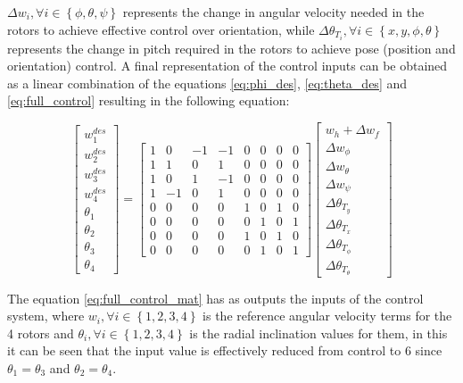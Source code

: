 \documentclass[a4paper, 12pt, oneside]{book}
\begin{document}
$\Delta w_i, \forall i \in \left \{ \phi, \theta, \psi \right \}$ represents the change in angular velocity needed in the rotors to achieve effective control over orientation, while $\Delta \theta_{T_i}, \forall i \in \left \{ x, y, \phi, \theta \right \}$ represents the change in pitch required in the rotors to achieve pose (position and orientation) control. A final representation of the control inputs can be obtained as a linear combination of the equations \ref{eq:phi_des}, \ref{eq:theta_des} and \ref{eq:full_control} resulting in the following equation:

\begin{equation}
\begin{bmatrix}
w_1^{des}\\ 
w_2^{des}\\ 
w_3^{des}\\ 
w_4^{des}\\ 
\theta_1\\ 
\theta_2\\ 
\theta_3\\ 
\theta_4
\end{bmatrix}
=
\begin{bmatrix}
1 & 0 & -1 & -1 & 0 & 0 & 0 & 0\\ 
1 & 1 & 0 & 1 & 0 & 0 & 0 & 0\\ 
1 & 0 & 1 & -1 & 0 & 0 & 0 & 0\\ 
1 & -1 & 0 & 1 & 0 & 0 & 0 & 0\\ 
0 & 0 & 0 & 0 & 1 & 0 & 1 & 0\\ 
0 & 0 & 0 & 0 & 0 & 1 & 0 & 1\\ 
0 & 0 & 0 & 0 & 1 & 0 & 1 & 0\\ 
0 & 0 & 0 & 0 & 0 & 1 & 0 & 1
\end{bmatrix}
\begin{bmatrix}
w_h+\Delta w_f\\ 
\Delta w_\phi\\ 
\Delta w_\theta\\ 
\Delta w_\psi\\ 
\Delta \theta_{T_y}\\ 
\Delta \theta_{T_x}\\ 
\Delta \theta_{T_\phi}\\ 
\Delta \theta_{T_\theta}
\end{bmatrix}
\label{eq:full_control_mat}
\end{equation}

The equation \ref{eq:full_control_mat} has as outputs the inputs of the control system, where $w_i, \forall i \in \left \{1, 2, 3, 4 \right \}$ is the reference angular velocity terms for the 4 rotors and $\theta_i, \forall i \in \left \{1, 2, 3, 4 \right \}$ is the radial inclination values for them, in this it can be seen that the input value is effectively reduced from control to 6 since $\theta_1 = \theta_3$ and $\theta_2 = \theta_4$.\\
\end{document}
